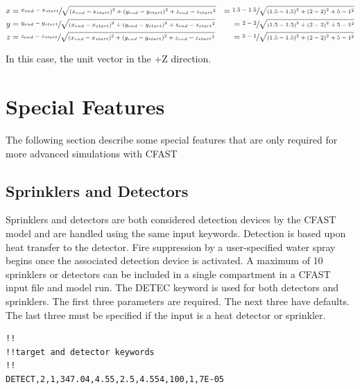 \begin{equation}
  \begin{aligned}
 x &= \sfrac{x_{end} - x_{start}}{\sqrt{{ \left( {x_{end} - x_{start}} \right) }^2 + { \left( {y_{end} - y_{start}} \right) }^2 + {z_{end} - z_{start}}^2}} &= \sfrac{1.5 - 1.5}{\sqrt{{ \left( {1.5 - 1.5} \right) }^2 + { \left( {2 - 2} \right) }^2 + {5 - 1}^2}} \\
 y &= \sfrac{y_{end} - y_{start}}{\sqrt{{ \left( {x_{end} - x_{start}} \right) }^2 + { \left( {y_{end} - y_{start}} \right) }^2 + {z_{end} - z_{start}}^2}} &= \sfrac{2 - 2}{\sqrt{{ \left( {1.5 - 1.5} \right) }^2 + { \left( {2 - 2} \right) }^2 + {5 - 1}^2}} \\
 z &= \sfrac{z_{end} - z_{start}}{\sqrt{{ \left( {x_{end} - x_{start}} \right) }^2 + { \left( {y_{end} - y_{start}} \right) }^2 + {z_{end} - z_{start}}^2}}  &= \sfrac{5 - 1}{\sqrt{{ \left( {1.5 - 1.5} \right) }^2 + { \left( {2 - 2} \right) }^2 + {5 - 1}^2}} \\
  \end{aligned}
\end{equation}

In this case, the unit vector in the +Z direction.

\newpage
\section{Special Features}

The following section describe some special features that are only required for more advanced simulations with CFAST

\subsection{Sprinklers and Detectors}

Sprinklers and detectors are both considered detection devices by the CFAST model and are handled using the same input keywords.  Detection is based upon heat transfer to the detector. Fire suppression by a user-specified water spray begins once the associated detection device is activated.  A maximum of 10 sprinklers or detectors can be included in a single compartment in a CFAST input file and model run. The DETEC keyword is used for both detectors and sprinklers. The first three parameters are required. The next three have defaults. The last three must be specified if the input is a heat detector or sprinkler.

\begin{lstlisting}
!!
!!target and detector keywords
!!
DETECT,2,1,347.04,4.55,2.5,4.554,100,1,7E-05
\end{lstlisting}


